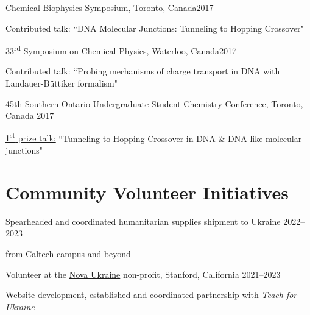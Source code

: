 \documentclass[margin,line]{res}
\newenvironment{list1}{
  \begin{list}{\ding{113}}{%
      \setlength{\itemsep}{0in}
      \setlength{\parsep}{0in} \setlength{\parskip}{0in}
      \setlength{\topsep}{0in} \setlength{\partopsep}{0in} 
      \setlength{\leftmargin}{0.17in}}}{\end{list}}
\begin{document}
\begin{resume}
Chemical Biophysics \href{www.chembiophys.ca}{Symposium}, Toronto, Canada\hfill{2017}

\begin{list1}
\item[]Contributed talk: ``DNA Molecular Junctions:  Tunneling to Hopping Crossover"
\end{list1}

\vspace*{-2mm}

\href{http://scp.uwaterloo.ca}{33\textsuperscript{rd} Symposium} on Chemical Physics, Waterloo, Canada\hfill{2017}

\begin{list1}
\item[]Contributed talk: ``Probing mechanisms of charge transport in DNA with Landauer-B\"uttiker formalism"
\end{list1}

\vspace*{-2mm}

45th Southern Ontario Undergraduate Student Chemistry \href{https://sites.google.com/view/souscc52/home}{Conference}, Toronto, Canada \hfill{2017}

\begin{list1}
\item[]\underline{1\textsuperscript{st} prize talk:}  ``Tunneling to Hopping Crossover in DNA \& DNA-like molecular junctions"
\end{list1}

\section{\sc Community Volunteer Initiatives}
Spearheaded and coordinated humanitarian supplies shipment to Ukraine \href{https://www.caltech.edu/about/news/organizing-aid-to-his-native-ukraine}{\faExternalLink}\hfill{2022--2023}

\begin{list1}
\item[]from Caltech campus and beyond
\end{list1}

\vspace*{-2mm}

Volunteer at the \href{https://novaukraine.org/}{Nova Ukraine} non-profit, Stanford, California \hfill{2021--2023}

\begin{list1}
\item[]Website development, established and coordinated partnership with {\em Teach for Ukraine}
\end{list1}


\end{resume}
\end{document}
